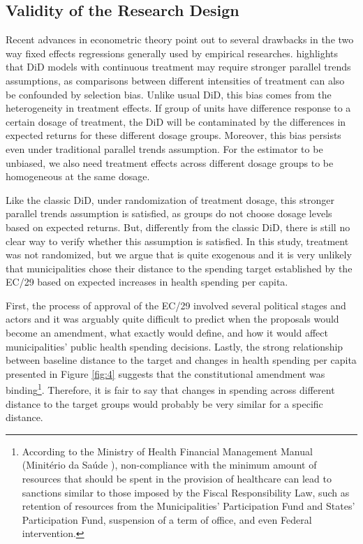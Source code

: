 \subsection{Validity of the Research Design}

Recent advances in econometric theory point out to several drawbacks in the two way fixed effects regressions generally used by empirical researches. \cite{callaway2021difference} highlights that DiD models with continuous treatment may require stronger parallel trends assumptions, as comparisons between different intensities of treatment can also be confounded by selection bias. Unlike usual DiD, this bias comes from the heterogeneity in treatment effects. If group of units have difference response to a certain dosage of treatment, the DiD will be contaminated by the differences in expected returns for these different dosage groups. Moreover, this bias persists even under traditional parallel trends assumption. For the estimator to be unbiased, we also need treatment effects across different dosage groups to be homogeneous at the same dosage. 

Like the classic DiD, under randomization of treatment dosage, this stronger parallel trends assumption is satisfied, as groups do not choose dosage levels based on expected returns. But, differently from the classic DiD, there is still no clear way to verify whether this assumption is satisfied. In this study, treatment was not randomized, but we argue that is quite exogenous and it is very unlikely that municipalities chose their distance to the spending target established by the EC/29 based on expected increases in health spending per capita. 

First, the process of approval of the EC/29 involved several political stages and actors and it was arguably quite difficult to predict when the proposals would become an amendment, what exactly would define, and how it would affect municipalities' public health spending decisions. Lastly, the strong relationship between baseline distance to the target and changes in health spending per capita presented in Figure \ref{fig:4} suggests that the constitutional amendment was binding\footnote{According to the Ministry of Health Financial Management Manual (Minitério da Saúde \citeyear{msmanual}), non-compliance with the minimum amount of resources that should be spent in the provision of healthcare can lead to sanctions similar to those imposed by the Fiscal Responsibility Law, such as retention of resources from the Municipalities’ Participation Fund and States’ Participation Fund, suspension of a term of office, and even Federal intervention.}. Therefore, it is fair to say that changes in spending across different distance to the target groups would probably be very similar for a specific distance.

